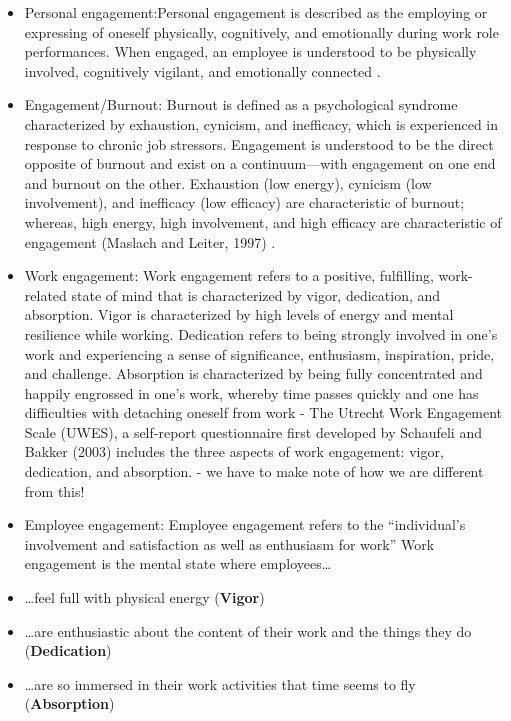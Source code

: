 \documentclass[
]{book}
\begin{document}
\begin{itemize}
\item
  Personal engagement:Personal engagement is described as the employing or expressing of oneself physically, cognitively, and emotionally during work role performances. When engaged, an employee is understood to be physically involved, cognitively vigilant, and emotionally connected \citep{kahn_psychological_1990}.
\item
  Engagement/Burnout: Burnout is defined as a psychological syndrome characterized by exhaustion, cynicism, and inefficacy, which is experienced in response to chronic job stressors. Engagement is understood to be the direct opposite of burnout and exist on a continuum---with engagement on one end and burnout on the other. Exhaustion (low energy), cynicism (low involvement), and inefficacy (low efficacy) are characteristic of burnout; whereas, high energy, high involvement, and high efficacy are characteristic of engagement (Maslach and Leiter, 1997) \citep{leiter_areas_2004}.
\item
  Work engagement: Work engagement refers to a positive, fulfilling, work-related state of mind that is characterized by vigor, dedication, and absorption. Vigor is characterized by high levels of energy and mental resilience while working. Dedication refers to being strongly involved in one's work and experiencing a sense of significance, enthusiasm, inspiration, pride, and challenge. Absorption is characterized by being fully concentrated and happily engrossed in one's work, whereby time passes quickly and one has difficulties with detaching oneself from work \citep{schaufeli_measurement_2002} - The Utrecht Work Engagement Scale (UWES), a self-report questionnaire first developed by Schaufeli and Bakker (2003) \citep{schaufeli_uwesutrecht_2003} includes the three aspects of work engagement: vigor, dedication, and absorption. - we have to make note of how we are different from this!
\item
  Employee engagement: Employee engagement refers to the ``individual's involvement and satisfaction as well as enthusiasm for work'' \citep{harter_business-unit-level_2002}
  Work engagement is the mental state where employees\ldots{}
\item
  \ldots feel full with physical energy (\textbf{Vigor})
\item
  \ldots are enthusiastic about the content of their work and the things they do (\textbf{Dedication})
\item
  \ldots are so immersed in their work activities that time seems to fly (\textbf{Absorption})
\end{itemize}
\end{document}

